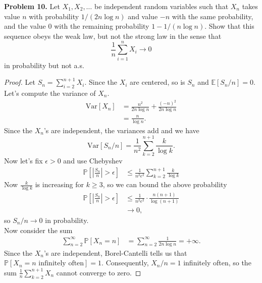\documentclass[11pt,letterpaper]{report}
\newcommand{\E}{\mathbb{E}}
\newcommand{\Prob}{\mathbb{P}}
\newcommand{\Var}{\text{Var}}
\begin{document}
\noindent\textbf{Problem 10. }
Let $X_1, X_2, \ldots$ be independent random variables such that $X_n$ takes value $n$ with probability $1/(2n\log n)$ and value $-n$ with the same probability, and the value 0 with the remaining probability $1- 1/(n\log n)$. Show that this sequence obeys the weak law, but not the strong law in the sense that
\[
\frac{1}{n}\sum_{i=1}^nX_i\to 0
\]
in probability but not a.s.
\begin{proof}
	Let $S_n = \sum_{i=2}^{n+1} X_i$. Since the $X_i$ are centered, so is $S_n$ and $\E[S_n/n] = 0$. Let's compute the variance of $X_n$.
	\begin{align*}
		\Var[X_n] &= \frac{n^2}{2n\log n} + \frac{(-n)^2}{2n\log n}\\
		&= \frac{n}{\log n}.
	\end{align*}
	Since the $X_n$'s are independent, the variances add and we have
	\[
	\Var[S_n/n] = \frac{1}{n^2}\sum_{k=2}^{n+1}\frac{k}{\log k}.
	\]
	Now let's fix $\epsilon>0$ and use Chebyshev
	\begin{equation}
	\begin{split}
		\Prob\left[\left|\frac{S_n}{n}\right|>\epsilon\right] &\leq \frac{1}{n^2\epsilon^2}\sum_{k=2}^{n+1}\frac{k}{\log k}
	\end{split}
	\end{equation}
	Now $\frac{k}{\log k}$ is increasing for $k\geq 3$, so we can bound the above probability
	\begin{align*}
		\Prob\left[\left|\frac{S_n}{n}\right|>\epsilon\right] &\leq \frac{1}{n^2\epsilon^2}\cdot \frac{n(n+1)}{\log(n+1)}\\
		&\to 0,
	\end{align*}
	so $S_n/n \to 0$ in probability.\\

	\noindent Now consider the sum
	\begin{align*}
		\sum_{n=2}^\infty \Prob[X_n = n] &= \sum_{n=2}^\infty \frac{1}{2n\log n} = +\infty.
	\end{align*}
	Since the $X_n$'s are independent, Borel-Cantelli tells us that $\Prob[X_n = n\text{ infinitely often}] = 1$. Consequently, $X_n/n = 1$ infinitely often, so the sum $\frac{1}{n}\sum_{k=2}^{n+1}X_n$ cannot converge to zero.
\end{proof}
\end{document}

